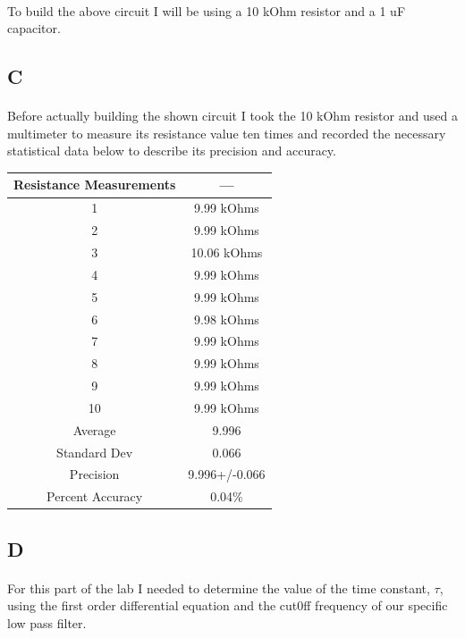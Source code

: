 \documentclass[12pt]{article}
\begin{document}
			\paragraph{}
				To build the above circuit I will be using a 10 kOhm resistor and a 1 uF capacitor.
		
		\subsection{C}
			\paragraph{}
				Before actually building the shown circuit I took the 10 kOhm resistor and used a multimeter to measure its resistance value 
				ten times and recorded the necessary statistical data below to describe its precision and accuracy.

				\begin{center}
					\begin{tabular}{ |c|c| }
						\hline
						\textbf{Resistance Measurements} & --- \\ 
						\hline
 						1 & 9.99 kOhms \\ 
						2 & 9.99 kOhms \\ 
						3 & 10.06 kOhms \\ 
						4 & 9.99 kOhms \\ 
						5 & 9.99 kOhms \\ 
						6 & 9.98 kOhms \\ 
						7 & 9.99 kOhms \\ 
						8 & 9.99 kOhms \\ 
						9 & 9.99 kOhms \\ 
						10 & 9.99 kOhms  \\ 
						Average & 9.996 \\
						Standard Dev & 0.066\\
						Precision & 9.996+/-0.066\\
						Percent Accuracy & 0.04\% \\
						\hline
					\end{tabular}
				\end{center}

		\subsection{D}
			\paragraph{}
				For this part of the lab I needed to determine the value of the time constant, $\tau$, using the first order differential equation 
				and the cut0ff frequency of our specific low pass filter.
\end{document}
